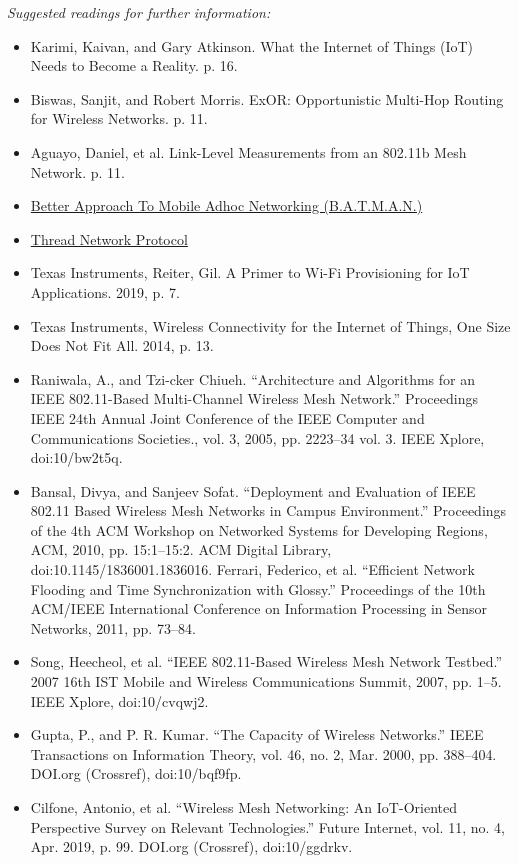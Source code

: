 \documentclass[conference]{IEEEtran}
\begin{document}
\noindent \textit{Suggested readings for further information:}
\begin{itemize}
    \item Karimi, Kaivan, and Gary Atkinson. What the Internet of Things (IoT) Needs to Become a Reality. p. 16.
    \item Biswas, Sanjit, and Robert Morris. ExOR: Opportunistic Multi-Hop Routing for Wireless Networks. p. 11.
    \item Aguayo, Daniel, et al. Link-Level Measurements from an 802.11b Mesh Network. p. 11.
    \item \href{https://www.open-mesh.org/projects/batman-adv/wiki/Quick-start-guide}{Better Approach To Mobile Adhoc Networking (B.A.T.M.A.N.)}
    \item \href{https://openthread.io/guides/thread-primer}{Thread Network Protocol}
    \item Texas Instruments, Reiter, Gil. A Primer to Wi-Fi Provisioning for IoT Applications. 2019, p. 7.
    \item Texas Instruments, Wireless Connectivity for the Internet of Things, One Size Does Not Fit All. 2014, p. 13.
    \item Raniwala, A., and Tzi-cker Chiueh. “Architecture and Algorithms for an IEEE 802.11-Based Multi-Channel Wireless Mesh Network.” Proceedings IEEE 24th Annual Joint Conference of the IEEE Computer and Communications Societies., vol. 3, 2005, pp. 2223–34 vol. 3. IEEE Xplore, doi:10/bw2t5q.
    \item Bansal, Divya, and Sanjeev Sofat. “Deployment and Evaluation of IEEE 802.11 Based Wireless Mesh Networks in Campus Environment.” Proceedings of the 4th ACM Workshop on Networked Systems for Developing Regions, ACM, 2010, pp. 15:1–15:2. ACM Digital Library, doi:10.1145/1836001.1836016.
    \itme Ferrari, Federico, et al. “Efficient Network Flooding and Time Synchronization with Glossy.” Proceedings of the 10th ACM/IEEE International Conference on Information Processing in Sensor Networks, 2011, pp. 73–84.
    \item Song, Heecheol, et al. “IEEE 802.11-Based Wireless Mesh Network Testbed.” 2007 16th IST Mobile and Wireless Communications Summit, 2007, pp. 1–5. IEEE Xplore, doi:10/cvqwj2.
    \item Gupta, P., and P. R. Kumar. “The Capacity of Wireless Networks.” IEEE Transactions on Information Theory, vol. 46, no. 2, Mar. 2000, pp. 388–404. DOI.org (Crossref), doi:10/bqf9fp.
    \item Cilfone, Antonio, et al. “Wireless Mesh Networking: An IoT-Oriented Perspective Survey on Relevant Technologies.” Future Internet, vol. 11, no. 4, Apr. 2019, p. 99. DOI.org (Crossref), doi:10/ggdrkv.
\end{itemize}
\end{document}
